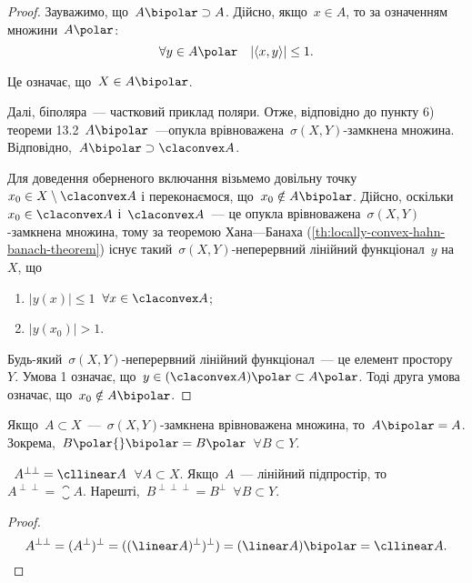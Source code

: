 \begin{proof}
    Зауважимо, що~$A\bipolar \supset A$. Дійсно, якщо~$x \in A$, то за означенням множини~$A\polar$:
    \begin{equation*}
        \forall y \in A\polar \quad |\langle x, y \rangle| \le 1.
    \end{equation*}

    Це означає, що~$X \in A\bipolar$.

    Далі, біполяра~--- частковий приклад поляри. Отже, відповідно до пункту 6) теореми 13.2~$A\bipolar$~---опукла врівноважена~$\sigma(X, Y)$-замкнена множина. Відповідно,~$A\bipolar \supset \claconvex A$.
    
    Для доведення оберненого включання візьмемо довільну точку~$x_0 \in X \setminus \claconvex A$ і переконаємося, що~$x_0 \notin A\bipolar$. Дійсно, оскільки~$x_0 \in \claconvex A$ і~$\claconvex A$~--- це опукла врівноважена~$\sigma(X, Y)$-замкнена множина, тому за теоремою Хана---Банаха (\cref{th:locally-convex-hahn-banach-theorem}) існує такий~$\sigma(X, Y)$-неперервний лінійний функціонал~$y$ на~$X$, що
    \begin{enumerate}
        \item $|y(x)| \le 1$~$\forall x \in \claconvex A$;
        \item $|y(x_0)| > 1$.
    \end{enumerate}

    Будь-який~$\sigma(X, Y)$-неперервний лінійний функціонал~--- це елемент простору~$Y$. Умова 1 означає, що~$y \in (\claconvex A)\polar \subset A\polar$. Тоді друга умова означає, що~$x_0 \notin A\bipolar$.
\end{proof}

\begin{corollary}
    Якщо~$A \subset X$~---~$\sigma(X, Y)$-замкнена врівноважена множина, то~$A\bipolar = A$. Зокрема,~$B\polar{}\bipolar = B\polar$~$\forall B \subset Y$.
\end{corollary}

\begin{corollary}
   ~$A^{\perp\perp} = \cllinear A$~$\forall A \subset X$. Якщо~$A$~--- лінійний підпростір, то~$A^{\perp\perp} = \closure A$. Нарешті,~$B^{\perp\perp\perp} = B^\perp$~$\forall B \subset Y$.
\end{corollary}

\begin{proof}
    \begin{equation*}
        A^{\perp\perp} = (A^\perp)^\perp = ((\linear A)^\perp)^\perp) = (\linear A)\bipolar = \cllinear A. \qedhere
    \end{equation*}
\end{proof}

